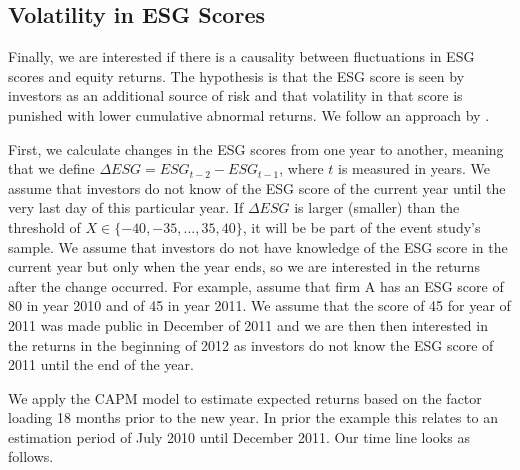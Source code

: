 \documentclass[11pt]{article}
\begin{document}
\subsection{Volatility in ESG Scores}

Finally, we are interested if there is a causality between fluctuations in ESG scores and equity returns. The hypothesis is that the ESG score is seen by investors as an additional source of risk and that volatility in that score is punished with lower cumulative abnormal returns. We follow an approach by \citet{Campbell1997}.

First, we calculate changes in the ESG scores from one year to another, meaning that we define $\Delta ESG = ESG_{t-2} - ESG_{t-1}$, where $t$ is measured in years. We assume that investors do not know of the ESG score of the current year until the very last day of this particular year. If $\Delta ESG$ is larger (smaller) than the threshold of $X \in \{ -40, -35, ..., 35, 40\}$, it will be be part of the event study's sample. We assume that investors do not have knowledge of the ESG score in the current year but only when the year ends, so  we are interested in the returns after the change occurred. For example, assume that firm A has an ESG score of 80 in year 2010 and of 45 in year 2011. We assume that the score of 45 for year of 2011 was made public in December of 2011 and we are then then interested in the returns in the beginning of 2012 as investors do not know the ESG score of 2011 until the end of the year.

We apply the CAPM model to estimate expected returns based on the factor loading 18 months prior to the new year. In prior the example this relates to an estimation period of July 2010 until December 2011. Our time line looks as follows.
\end{document}
